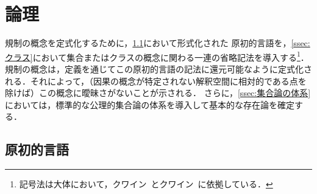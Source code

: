
\section{論理}
\label{sec:論理}

規制の概念を定式化するために，\ref{ssec:原初的言語}において形式化された
原初的言語を，\ref{ssec:クラス}において集合またはクラスの概念に関わる一連の省略記法を導入する\footnote{記号法は大体において，クワイン~\cite{クワインa}とクワイン~\cite{クワインb}に依拠している．}．
規制の概念は，定義を通じてこの原初的言語の記法に還元可能なように定式化される．それによって，（因果の概念が特定されない解釈空間に相対的である点を除けば）この概念に曖昧さがないことが示される．
さらに，\ref{ssec:集合論の体系}においては，標準的な公理的集合論の体系を導入して基本的な存在論を確定する．

\subsection{原初的言語}
\label{ssec:原初的言語}

